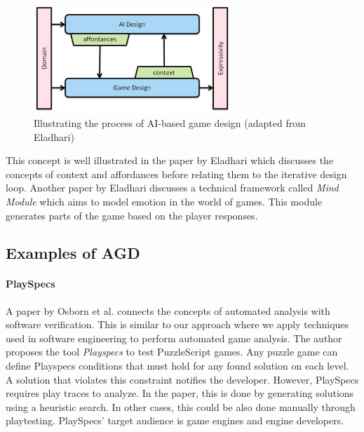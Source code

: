 \begin{figure}[!t]
    \centering
    \includegraphics[width=0.66\textwidth]{images/AI-based game desig.png}
    \caption{Illustrating the process of AI-based game design (adapted from Eladhari\cite{Eladhari2011AIBasedGD})}
    \label{fig:ai-based game design}
\end{figure}

This concept is well illustrated in the paper by Eladhari\cite{Eladhari2011AIBasedGD} which discusses the concepts of context and affordances before relating them to the iterative design loop. Another paper by Eladhari\cite{10.1145/1501750.1501798} discusses a technical framework called \textit{Mind Module} which aims to model emotion in the world of games. This module generates parts of the game based on the player responses.

\subsection{Examples of AGD}
\paragraph{PlaySpecs} A paper by Osborn et al.\cite{osborn2015playspecs} connects the concepts of automated analysis with software verification. This is similar to our approach where we apply techniques used in software engineering to perform automated game analysis. The author proposes the tool \emph{Playspecs} to test PuzzleScript games. Any puzzle game can define Playspecs conditions that must hold for any found solution on each level. A solution that violates this constraint notifies the developer. However, PlaySpecs requires play traces to analyze. In the paper, this is done by generating solutions using a heuristic search. In other cases, this could be also done manually through playtesting. PlaySpecs' target audience is game engines and engine developers.

